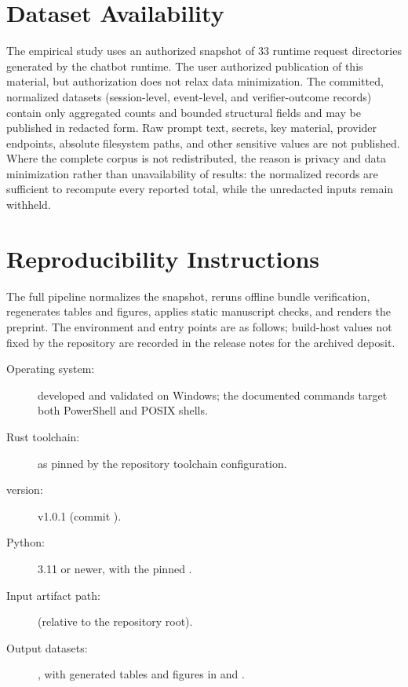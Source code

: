 \section*{Dataset Availability}\label{sec:dataset-availability}
The empirical study uses an authorized snapshot of 33 runtime request
directories generated by the chatbot runtime. The user authorized publication of
this material, but authorization does not relax data minimization. The committed,
normalized datasets (session-level, event-level, and verifier-outcome records)
contain only aggregated counts and bounded structural fields and may be
published in redacted form. Raw prompt text, secrets, key material, provider
endpoints, absolute filesystem paths, and other sensitive values are not
published. Where the complete corpus is not redistributed, the reason is privacy
and data minimization rather than unavailability of results: the normalized
records are sufficient to recompute every reported total, while the unredacted
inputs remain withheld.

\section*{Reproducibility Instructions}\label{sec:reproducibility-instructions}
The full pipeline normalizes the snapshot, reruns offline bundle verification,
regenerates tables and figures, applies static manuscript checks, and renders
the preprint. The environment and entry points are as follows; build-host values
not fixed by the repository are recorded in the release notes for the archived
deposit.

\begin{description}
\item[Operating system:] developed and validated on Windows; the documented
commands target both PowerShell and POSIX shells.
\item[Rust toolchain:] as pinned by the repository toolchain configuration.
\item[\Argorix version:] v1.0.1 (commit ).
\item[Python:] 3.11 or newer, with the pinned .
\item[Input artifact path:] 
(relative to the repository root).
\item[Output datasets:] , with generated tables and figures in
 and .
\end{description}

